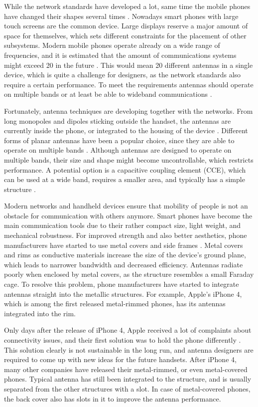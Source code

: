 While the network standards have developed a lot, same time the mobile phones have changed their shapes several times \cite{anguera2}. Nowadays smart phones with large touch screens are the common device. Large displays reserve a major amount of space for themselves, which sets different constraints for the placement of other subsystems. Modern mobile phones operate already on a wide range of frequencies, and it is estimated that the amount of communications systems might exceed 20 in the future \cite{20ant}. This would mean 20 different antennas in a single device, which is quite a challenge for designers, as the network standards also require a certain performance. To meet the requirements antennas should operate on multiple bands or at least be able to wideband communications \cite{lehtovuori_wideband_match}.

Fortunately, antenna techniques are developing together with the networks. From long monopoles and dipoles sticking outside the handset, the antennas are currently inside the phone, or integrated to the housing of the device \cite{saunders,molisch}. Different forms of planar antennas have been a popular choice, since they are able to operate on multiple bands \cite{anguera}. Although antennas are designed to operate on multiple bands, their size and shape might become uncontrollable, which restricts performance. A potential option is a capacitive coupling element (CCE), which can be used at a wide band, requires a smaller area, and typically has a simple structure \cite{valkonen_cce2}.

Modern networks and handheld devices ensure that mobility of people is not an obstacle for communication with others anymore. Smart phones have become the main communication tools due to their rather compact size, light weight, and mechanical robustness. For improved strength and also better aesthetics, phone manufacturers have started to use metal covers and side frames \cite{rowell}. Metal covers and rims as conductive materials increase the size of the device's ground plane, which leads to narrower bandwidth and decreased efficiency. Antennas radiate poorly when enclosed by metal covers, as the structure resembles a small Faraday cage. To resolve this problem, phone manufacturers have started to integrate antennas straight into the metallic structures. For example, Apple's iPhone 4, which is among the first released metal-rimmed phones, has its antennas integrated into the rim. 

Only days after the release of iPhone 4, Apple received a lot of complaints about connectivity issues, and their first solution was to hold the phone differently \cite{apple_press,apple_bbc}. This solution clearly is not sustainable in the long run, and antenna designers are required to come up with new ideas for the future handsets. After iPhone 4, many other companies have released their metal-rimmed, or even metal-covered phones. Typical antenna has still been integrated to the structure, and is usually separated from the other structures with a slot. In case of metal-covered phones, the back cover also has slots in it to improve the antenna performance. 

